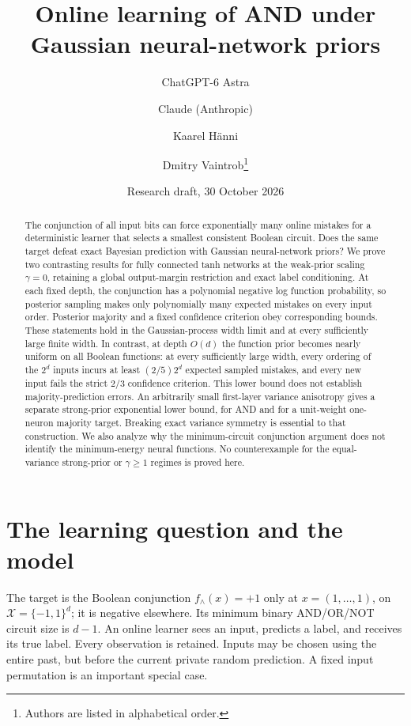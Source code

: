 \documentclass[11pt]{article}
\title{Online learning of AND under Gaussian neural-network priors}
\author{ChatGPT-6 Astra \and Claude (Anthropic) \and Kaarel H\"anni \and Dmitry Vaintrob\thanks{Authors are listed in alphabetical order.}}
\date{Research draft, 30 October 2026}
\begin{document}
\maketitle
\begin{abstract}
The conjunction of all input bits can force exponentially many online
mistakes for a deterministic learner that selects a smallest consistent
Boolean circuit. Does the same target defeat exact Bayesian prediction
with Gaussian neural-network priors? We prove two contrasting results
for fully connected tanh networks at the weak-prior scaling $\gamma=0$,
retaining a global output-margin restriction and exact label conditioning.
At each fixed depth, the conjunction has a polynomial negative log
function probability, so posterior sampling makes only polynomially many
expected mistakes on every input order. Posterior majority and a fixed
confidence criterion obey corresponding bounds. These statements hold
in the Gaussian-process width limit and at every sufficiently large
finite width. In contrast, at depth $O(d)$ the function prior becomes
nearly uniform on all Boolean functions: at every sufficiently large
width, every ordering of the $2^d$ inputs incurs at least
$(2/5)2^d$ expected sampled mistakes, and every new input fails the
strict $2/3$ confidence criterion. This lower bound does not establish
majority-prediction errors. An arbitrarily small first-layer variance anisotropy gives a separate
strong-prior exponential lower bound, for AND and for a unit-weight
one-neuron majority target. Breaking exact variance symmetry is essential to
that construction. We also analyze why the minimum-circuit conjunction
argument does not identify the minimum-energy neural functions. No counterexample for the equal-variance strong-prior or
$\gamma\ge1$ regimes is proved here.
\end{abstract}

\section{The learning question and the model}
The target is the Boolean conjunction
$f_\wedge(x)=+1$ only at $x=(1,\ldots,1)$, on
$\mathcal X=\{-1,1\}^d$; it is negative elsewhere. Its minimum
binary AND/OR/NOT circuit size is $d-1$. An online learner sees an
input, predicts a label, and receives its true label. Every observation
is retained. Inputs may be chosen using the entire past, but before
the current private random prediction. A fixed input permutation is
an important special case.
\end{document}
